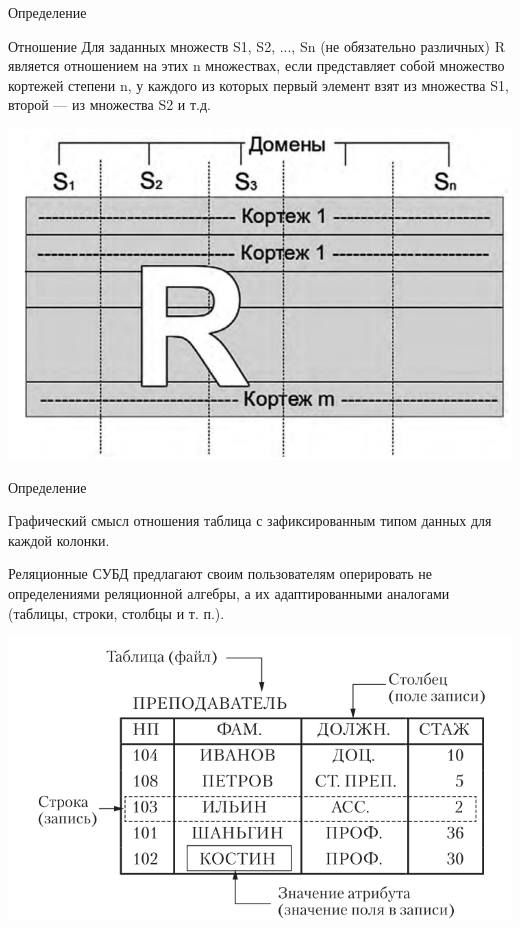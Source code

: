 \documentclass{beamer}
\begin{document}
\begin{frame}{Определение}
\begin{block}{Отношение}
Для заданных множеств S1, S2, ..., Sn (не обязательно различных) R является отношением на этих n множествах, если представляет собой множество кортежей степени n, у каждого из которых первый элемент взят из множества S1, второй — из множества S2 и т.д. 
\end{block}
\begin{center}
\includegraphics[scale=0.35]{images/rel-01.png}
\end{center}
\end{frame} 

\begin{frame}{Определение}
\begin{block}{Графический смысл отношения}
таблица с зафиксированным типом данных для каждой колонки. 
\end{block}
Реляционные СУБД предлагают своим пользователям оперировать не определениями реляционной алгебры, а их адаптированными аналогами (таблицы, строки, столбцы и т. п.).
\begin{center}
\includegraphics[scale=0.35]{images/rel-03.png}
\end{center}
\end{frame}
\end{document}
